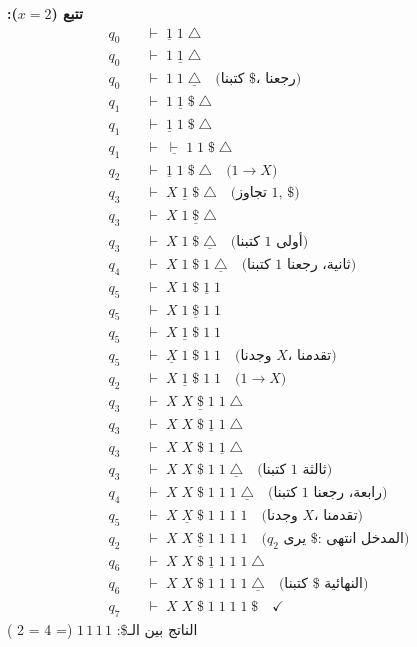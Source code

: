 \documentclass[14pt]{extarticle}
\begin{document}
\textbf{تتبع ($x = 2$):}
{\small
\begin{align*}
q_0 \quad &\vdash \; \underline{1} \; 1 \; \triangle \\
q_0 \quad &\vdash \; 1 \; \underline{1} \; \triangle \\
q_0 \quad &\vdash \; 1 \; 1 \; \underline{\triangle} \quad \text{(كتبنا $\$$، رجعنا)} \\
q_1 \quad &\vdash \; 1 \; \underline{1} \; \$ \; \triangle \\
q_1 \quad &\vdash \; \underline{1} \; 1 \; \$ \; \triangle \\
q_1 \quad &\vdash \; \underline{\vdash} \; 1 \; 1 \; \$ \; \triangle \\
q_2 \quad &\vdash \; \underline{1} \; 1 \; \$ \; \triangle \quad \text{($1 \to X$)} \\
q_3 \quad &\vdash \; X \; \underline{1} \; \$ \; \triangle \quad \text{(تجاوز $1$, $\$$)} \\
q_3 \quad &\vdash \; X \; 1 \; \underline{\$} \; \triangle \\
q_3 \quad &\vdash \; X \; 1 \; \$ \; \underline{\triangle} \quad \text{(كتبنا $1$ أولى)} \\
q_4 \quad &\vdash \; X \; 1 \; \$ \; 1 \; \underline{\triangle} \quad \text{(كتبنا $1$ ثانية، رجعنا)} \\
q_5 \quad &\vdash \; X \; 1 \; \$ \; \underline{1} \; 1 \\
q_5 \quad &\vdash \; X \; 1 \; \underline{\$} \; 1 \; 1 \\
q_5 \quad &\vdash \; X \; \underline{1} \; \$ \; 1 \; 1 \\
q_5 \quad &\vdash \; \underline{X} \; 1 \; \$ \; 1 \; 1 \quad \text{(وجدنا $X$، تقدمنا)} \\
q_2 \quad &\vdash \; X \; \underline{1} \; \$ \; 1 \; 1 \quad \text{($1 \to X$)} \\
q_3 \quad &\vdash \; X \; X \; \underline{\$} \; 1 \; 1 \; \triangle \\
q_3 \quad &\vdash \; X \; X \; \$ \; \underline{1} \; 1 \; \triangle \\
q_3 \quad &\vdash \; X \; X \; \$ \; 1 \; \underline{1} \; \triangle \\
q_3 \quad &\vdash \; X \; X \; \$ \; 1 \; 1 \; \underline{\triangle} \quad \text{(كتبنا $1$ ثالثة)} \\
q_4 \quad &\vdash \; X \; X \; \$ \; 1 \; 1 \; 1 \; \underline{\triangle} \quad \text{(كتبنا $1$ رابعة، رجعنا)} \\
q_5 \quad &\vdash \; X \; \underline{X} \; \$ \; 1 \; 1 \; 1 \; 1 \quad \text{(وجدنا $X$، تقدمنا)} \\
q_2 \quad &\vdash \; X \; X \; \underline{\$} \; 1 \; 1 \; 1 \; 1 \quad \text{($q_2$ يرى $\$$: المدخل انتهى)} \\
q_6 \quad &\vdash \; X \; X \; \$ \; \underline{1} \; 1 \; 1 \; 1 \; \triangle \\
q_6 \quad &\vdash \; X \; X \; \$ \; 1 \; 1 \; 1 \; 1 \; \underline{\triangle} \quad \text{(كتبنا $\$$ النهائية)} \\
q_7 \quad &\vdash \; X \; X \; \$ \; 1 \; 1 \; 1 \; 1 \; \$ \quad \checkmark
\end{align*}
}
الناتج بين الـ\$: $1\,1\,1\,1$ (= 4 = 2 ) \checkmark
\end{document}
